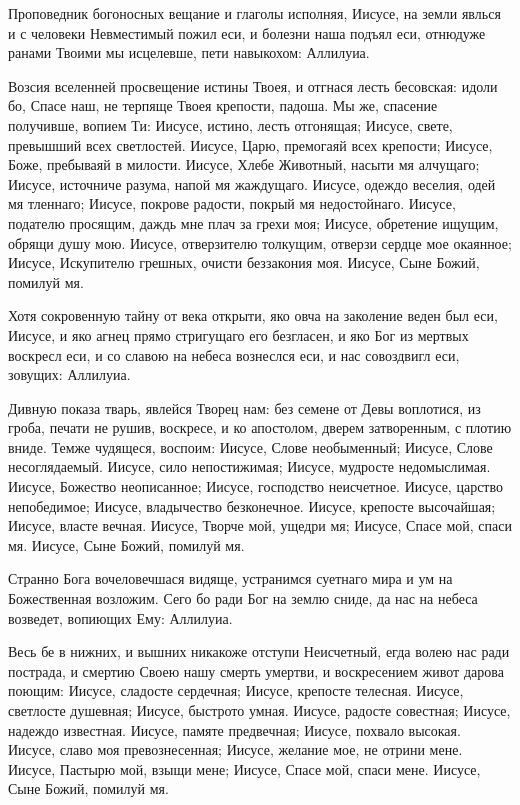 

Проповедник
богоносных вещание и глаголы исполняя, Иисусе, на земли явлься и с человеки Невместимый пожил еси, и болезни наша подъял еси, отнюдуже ранами Твоими мы исцелевше, пети навыкохом: Аллилуиа.




Возсия
вселенней просвещение истины Твоея, и отгнася лесть бесовская: идоли бо, Спасе наш, не терпяще Твоея крепости, падоша. Мы же, спасение получивше, вопием Ти: Иисусе, истино, лесть отгонящая; Иисусе, свете, превышший всех светлостей. Иисусе, Царю, премогаяй всех крепости; Иисусе, Боже, пребываяй в милости. Иисусе, Хлебе Животный, насыти мя алчущаго; Иисусе, источниче разума, напой мя жаждущаго. Иисусе, одеждо веселия, одей мя тленнаго; Иисусе, покрове радости, покрый мя недостойнаго. Иисусе, подателю просящим, даждь мне плач за грехи моя; Иисусе, обретение ищущим, обрящи душу мою. Иисусе, отверзителю толкущим, отверзи сердце мое окаянное; Иисусе, Искупителю грешных, очисти беззакония моя. Иисусе, Сыне Божий, помилуй мя.




Хотя
сокровенную тайну от века открыти, яко овча на заколение веден был еси, Иисусе, и яко агнец прямо стригущаго его безгласен, и яко Бог из мертвых воскресл еси, и со славою на небеса вознеслся еси, и нас совоздвигл еси, зовущих: Аллилуиа. 




Дивную
показа тварь, явлейся Творец нам: без семене от Девы воплотися, из гроба, печати не рушив, воскресе, и ко апостолом, дверем затворенным, с плотию вниде. Темже чудящеся, воспоим: Иисусе, Слове необыменный; Иисусе, Слове несоглядаемый. Иисусе, сило непостижимая; Иисусе,
мудросте недомыслимая. Иисусе, Божество неописанное; Иисусе, господство неисчетное. Иисусе, царство непобедимое; Иисусе, владычество безконечное. Иисусе, крепосте высочайшая; Иисусе, власте вечная. Иисусе, Творче мой, ущедри мя; Иисусе, Спасе мой, спаси мя. Иисусе, Сыне Божий, помилуй мя.




Странно
Бога вочеловечшася видяще, устранимся суетнаго мира и ум на Божественная возложим. Сего бо ради Бог на землю сниде, да нас на небеса возведет, вопиющих Ему: Аллилуиа. 




Весь
бе в нижних, и вышних никакоже отступи Неисчетный, егда волею нас ради пострада, и смертию Своею нашу смерть умертви, и воскресением живот дарова поющим: Иисусе, сладосте сердечная; Иисусе, крепосте телесная. Иисусе, светлосте душевная; Иисусе, быстрото умная. Иисусе, радосте совестная; Иисусе, надеждо известная. Иисусе, памяте предвечная; Иисусе, похвало высокая. Иисусе, славо моя превознесенная; Иисусе, желание мое, не отрини мене. Иисусе, Пастырю мой, взыщи мене; Иисусе, Спасе мой, спаси мене. Иисусе, Сыне Божий, помилуй мя. 


